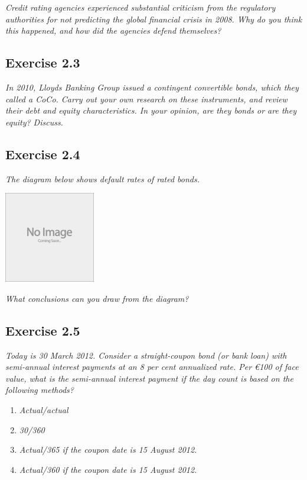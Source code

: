 \documentclass[]{book}
\newcommand{\euro}{€}
\theoremstyle{definition}
\theoremstyle{definition}
\theoremstyle{remark}
\begin{document}
\emph{Credit rating agencies experienced substantial criticism from the
regulatory authorities for not predicting the global financial crisis in
2008. Why do you think this happened, and how did the agencies defend
themselves?} \citep[p.55]{book}

\subsection{Exercise 2.3}\label{exercise-2.3}

\emph{In 2010, Lloyds Banking Group issued a contingent convertible
bonds, which they called a CoCo. Carry out your own research on these
instruments, and review their debt and equity characteristics. In your
opinion, are they bonds or are they equity? Discuss.} \citep[p.56]{book}

\subsection{Exercise 2.4}\label{exercise-2.4}

\emph{The diagram below shows default rates of rated bonds.}
\citep[p.56]{book}

\begin{center}\includegraphics[width=150px]{figures/placeholder} \end{center}

\emph{What conclusions can you draw from the diagram?}
\citep[p.56]{book}

\subsection{Exercise 2.5}\label{exercise-2.5}

\emph{Today is 30 March 2012. Consider a straight-coupon bond (or bank
loan) with semi-annual interest payments at an 8 per cent annualized
rate. Per \euro{}100 of face value, what is the semi-annual interest
payment if the day count is based on the following methods?}
\citep[p.56]{book}

\begin{enumerate}
\def\labelenumi{\alph{enumi}.}
\item
  \emph{Actual/actual} \citep[p.56]{book}
\item
  \emph{30/360} \citep[p.56]{book}
\item
  \emph{Actual/365 if the coupon date is 15 August 2012.}
  \citep[p.56]{book}
\item
  \emph{Actual/360 if the coupon date is 15 August 2012.}
  \citep[p.56]{book}
\end{enumerate}
\end{document}
